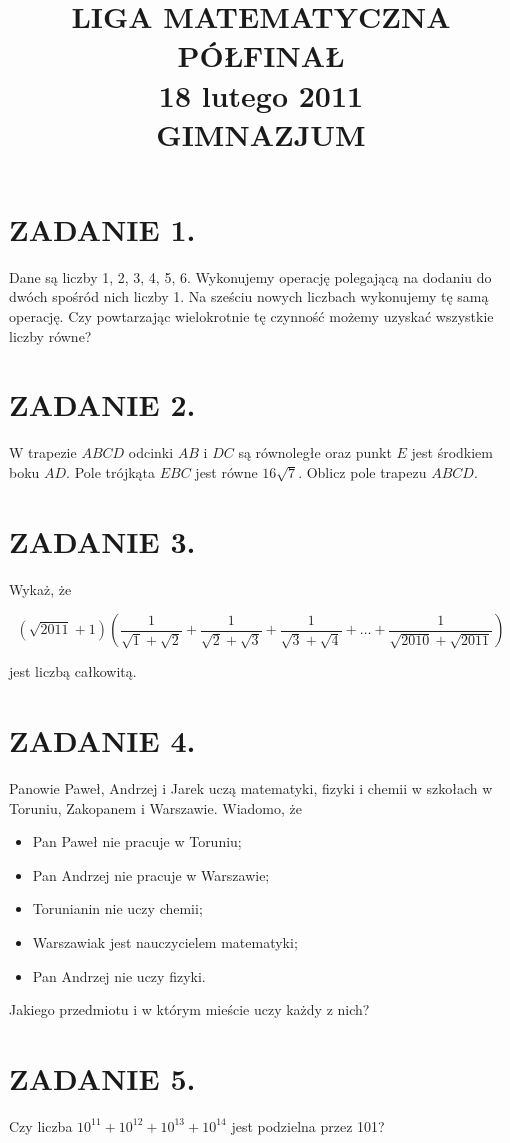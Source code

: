 \documentclass[10pt]{article}
\title{LIGA MATEMATYCZNA \\
 PÓŁFINAŁ \\
 18 lutego 2011 \\
 GIMNAZJUM }
\author{}
\date{}
\begin{document}
\maketitle
\section*{ZADANIE 1.}
Dane są liczby 1, 2, 3, 4, 5, 6. Wykonujemy operację polegającą na dodaniu do dwóch spośród nich liczby 1. Na sześciu nowych liczbach wykonujemy tę samą operację. Czy powtarzając wielokrotnie tę czynność możemy uzyskać wszystkie liczby równe?

\section*{ZADANIE 2.}
W trapezie \(A B C D\) odcinki \(A B\) i \(D C\) są równoległe oraz punkt \(E\) jest środkiem boku \(A D\). Pole trójkąta \(E B C\) jest równe \(16 \sqrt{7}\). Oblicz pole trapezu \(A B C D\).

\section*{ZADANIE 3.}
Wykaż, że

\[
(\sqrt{2011}+1)\left(\frac{1}{\sqrt{1}+\sqrt{2}}+\frac{1}{\sqrt{2}+\sqrt{3}}+\frac{1}{\sqrt{3}+\sqrt{4}}+\ldots+\frac{1}{\sqrt{2010}+\sqrt{2011}}\right)
\]

jest liczbą całkowitą.

\section*{ZADANIE 4.}
Panowie Paweł, Andrzej i Jarek uczą matematyki, fizyki i chemii w szkołach w Toruniu, Zakopanem i Warszawie. Wiadomo, że

\begin{itemize}
  \item Pan Paweł nie pracuje w Toruniu;
  \item Pan Andrzej nie pracuje w Warszawie;
  \item Torunianin nie uczy chemii;
  \item Warszawiak jest nauczycielem matematyki;
  \item Pan Andrzej nie uczy fizyki.
\end{itemize}

Jakiego przedmiotu i w którym mieście uczy każdy z nich?

\section*{ZADANIE 5.}
Czy liczba \(10^{11}+10^{12}+10^{13}+10^{14}\) jest podzielna przez 101?
\end{document}
